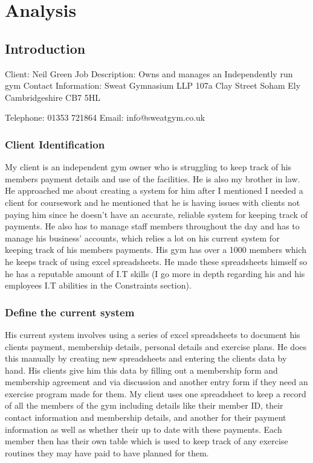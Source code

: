 \chapter{Analysis}

\section{Introduction}

Client: Neil Green
Job Description: Owns and manages an Independently run gym
Contact Information: Sweat Gymnasium LLP
					 107a Clay Street
					 Soham
					 Ely
					 Cambridgeshire
					 CB7 5HL

					 Telephone: 01353 721864
					 Email: info@sweatgym.co.uk

\subsection{Client Identification}

My client is an independent gym owner who is struggling to keep track of his members payment details and use of the facilities. He is also my brother in law. He approached me about creating a system for him after I mentioned I needed a client for coursework and he mentioned that he is having issues with clients not paying him since he doesn't have an accurate, reliable system for keeping track of payments. He also has to manage staff members throughout the day and has to manage his business' accounts, which relies a lot on his current system for keeping track of his members payments.  His gym has over a 1000 members which he keeps track of using excel spreadsheets. He made these spreadsheets himself so he has a reputable amount of I.T skills (I go more in depth regarding his and his employees I.T abilities in the Constraints section). 

\subsection{Define the current system}

His current system involves using a series of excel spreadsheets to document his clients payment, membership details, personal details and exercise plans. He does this manually by creating new spreadsheets and entering the clients data by hand. His clients give him this data by filling out a membership form and membership agreement and via discussion and another entry form if they need an exercise program made for them. My client uses one spreadsheet to keep a record of all the members of the gym including details like their member ID, their contact information and membership details, and another for their payment information  as well as whether their up to date with these payments. Each member then has their own table which is used to keep track of any exercise routines they may have paid to have planned for them.

